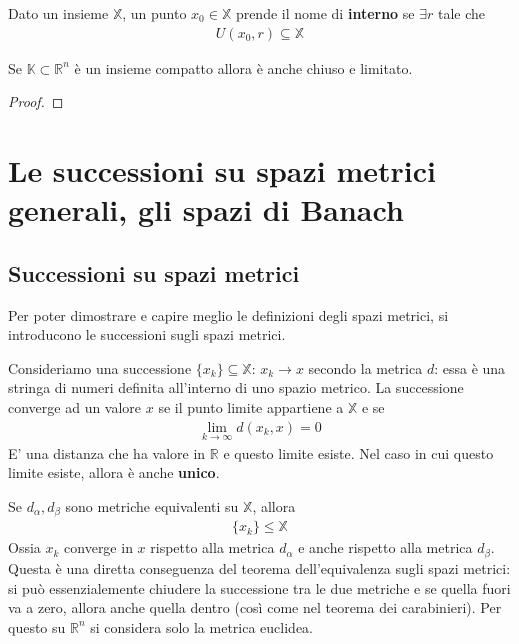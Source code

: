 \documentclass[a4paper, oneside]{book}
\begin{document}
\begin{definition}
    Dato un insieme $\mathbb{X}$, un punto $x_0 \in \mathbb{X}$ prende il nome di \textbf{interno} se $\exists r$ tale che
    \begin{gather*}
        U (x_0, r) \subseteq \mathbb{X} 
    \end{gather*}
\end{definition}
\begin{theorem}
    Se $\mathbb{K} \subset \mathbb{R}^{n}$ è un insieme compatto 
    allora è anche chiuso e limitato. 
\end{theorem}
\begin{proof}
\end{proof}

\section{Le successioni su spazi metrici generali, gli spazi di Banach}
\subsection{Successioni su spazi metrici}
Per poter dimostrare e capire meglio le definizioni degli spazi metrici, si introducono le 
successioni sugli spazi metrici.    
\begin{definition}[Successioni]
    Consideriamo una successione $\{x_k\} \subseteq \mathbb{X}$: $x_k \to x$ secondo la 
    metrica $d$: essa è una stringa di numeri
    definita all'interno di uno spazio metrico. La successione
    converge ad un valore $x$ se il punto limite appartiene a $\mathbb{X}$ e se
    \begin{gather*}
        \lim_{k \to \infty } d(x_k, x) = 0 
    \end{gather*}
    E' una distanza che ha valore in $\mathbb{R}$ e questo limite esiste. Nel caso in cui questo limite
    esiste, allora è anche \textbf{unico}.
\end{definition}
\begin{lemma}
    Se $d_{\alpha}, d_{\beta}$ sono metriche equivalenti su $\mathbb{X}$, allora
    \begin{align}
        \{x_k\} \leq \mathbb{X}
    \end{align}
    Ossia $x_k$ converge in $x$ rispetto alla metrica $d_{\alpha}$ e anche rispetto alla metrica $d_{\beta}$.
    Questa è una diretta conseguenza del teorema dell'equivalenza sugli spazi metrici: si può essenzialemente
    chiudere la successione tra le due metriche e se quella fuori va a zero, allora 
    anche quella dentro (così come nel teorema dei carabinieri). Per questo su $\mathbb{R}^{n}$ si considera solo la metrica euclidea.  
\end{lemma}
\end{document}
